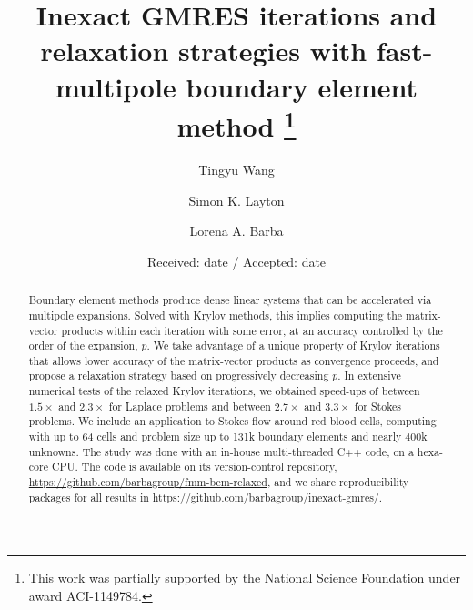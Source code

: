 \documentclass[smallcondensed,final]{svjour3}
\begin{document}
\title{Inexact GMRES iterations and relaxation strategies with fast-multipole boundary element method \thanks{
	This work was partially supported by the National Science Foundation under award ACI-1149784.}
}

\author{%
Tingyu Wang \and Simon K. Layton \and  Lorena A. Barba
}


\date{Received: date / Accepted: date}

\maketitle

\begin{abstract}
Boundary element methods produce dense linear systems that can be accelerated via multipole expansions. Solved with Krylov methods, this implies computing the matrix-vector products within each iteration with some error, at an accuracy controlled by the order of the expansion, $p$. We take advantage of a unique property of Krylov iterations that allows lower accuracy of the matrix-vector products as convergence proceeds, and propose a relaxation strategy based on progressively decreasing $p$. In extensive numerical tests of the relaxed Krylov iterations, we obtained speed-ups of between $1.5\times$ and $2.3\times$ for Laplace problems and between $2.7\times$ and $3.3\times$ for Stokes problems. We include an application to Stokes flow around red blood cells, computing with up to 64 cells and problem size up to 131k boundary elements and nearly 400k unknowns. The study was done with an in-house multi-threaded C++ code, on a hexa-core CPU. The code is available on its version-control repository, \url{https://github.com/barbagroup/fmm-bem-relaxed}, and we share reproducibility packages for all results in \url{https://github.com/barbagroup/inexact-gmres/}.

\end{abstract}
\end{document}
